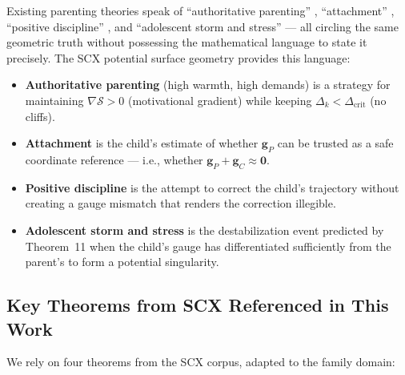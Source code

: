 \documentclass[11pt,a4paper]{article}
\newcommand{\gradS}{\nabla\mathcal{S}}
\begin{document}
Existing parenting theories speak of ``authoritative parenting'' \cite{baumrind1991parenting}, ``attachment'' \cite{bowlby1988secure}, ``positive discipline'' \cite{nelsen2006positive}, and ``adolescent storm and stress'' \cite{hall1904adolescence} — all circling the same geometric truth without possessing the mathematical language to state it precisely. The SCX potential surface geometry provides this language:

\begin{itemize}
    \item \textbf{Authoritative parenting} (high warmth, high demands) is a strategy for maintaining $\gradS > 0$ (motivational gradient) while keeping $\Delta_k < \Delta_{\text{crit}}$ (no cliffs).
    \item \textbf{Attachment} is the child's estimate of whether $\mathbf{g}_P$ can be trusted as a safe coordinate reference — i.e., whether $\mathbf{g}_P + \mathbf{g}_C \approx \mathbf{0}$.
    \item \textbf{Positive discipline} is the attempt to correct the child's trajectory without creating a gauge mismatch that renders the correction illegible.
    \item \textbf{Adolescent storm and stress} is the destabilization event predicted by Theorem~11 when the child's gauge has differentiated sufficiently from the parent's to form a potential singularity.
\end{itemize}

\subsection{Key Theorems from SCX Referenced in This Work}

We rely on four theorems from the SCX corpus, adapted to the family domain:
\end{document}
